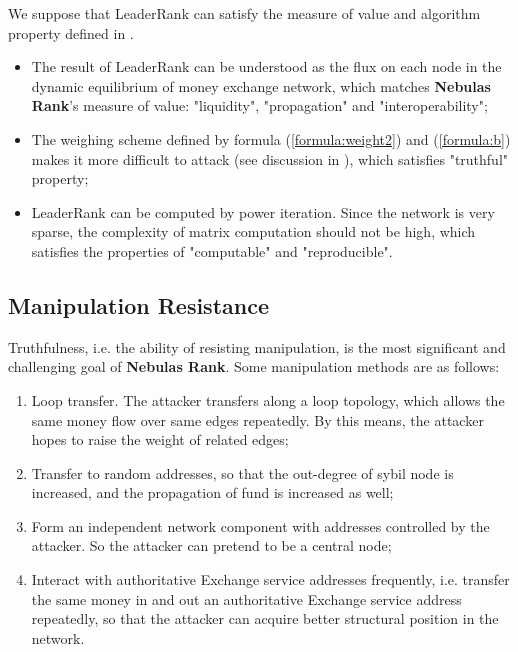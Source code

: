 We suppose that LeaderRank can satisfy the measure of value and algorithm property defined in .
\begin{itemize}
	\item The result of LeaderRank can be understood as the flux on each node in the dynamic equilibrium of money exchange network, which matches \textbf{Nebulas Rank}'s measure of value: "liquidity", "propagation" and "interoperability";
	\item The weighing scheme defined by formula (\ref{formula:weight2}) and (\ref{formula:b}) makes it more difficult to attack (see discussion in ), which satisfies "truthful" property;
	\item LeaderRank can be computed by power iteration. Since the network is very sparse, the complexity of matrix computation should not be high, which satisfies the properties of "computable" and "reproducible".
\end{itemize}


\subsection{Manipulation Resistance}\label{subsec:robust}
Truthfulness, i.e. the ability of resisting manipulation, is the most significant and challenging goal of \textbf{Nebulas Rank}. Some manipulation methods are as follows:
\begin{enumerate}
	\item Loop transfer. The attacker transfers along a loop topology, which allows the same money flow over same edges repeatedly. By this means, the attacker hopes to raise the weight of related edges;
	\item Transfer to random addresses, so that the out-degree of sybil node is increased, and the propagation of fund is increased as well;
	\item Form an independent network component with addresses controlled by the attacker. So the attacker can pretend to be a central node;
	\item Interact with authoritative Exchange service addresses frequently, i.e. transfer the same money in and out an authoritative Exchange service address repeatedly, so that the attacker can acquire better structural position in the network.
\end{enumerate}

